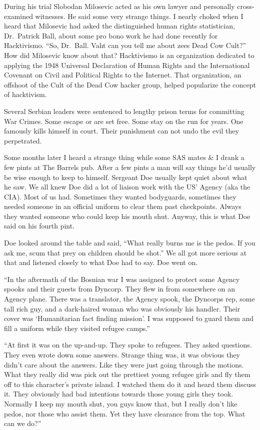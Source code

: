 During his trial Slobodan Milosevic acted as his own lawyer and personally cross-examined witnesses. He said some very strange things. I nearly choked when I heard that Milosevic had asked the distinguished human rights statistician, Dr.\ Patrick Ball, about some pro bono work he had done recently for Hacktivismo. ``So, Dr.\ Ball. Vaht can you tell me about zees Dead Cow Cult?'' How did Milosevic know about that? Hacktivismo is an organization dedicated to applying the 1948 Universal Declaration of Human Rights and the International Covenant on Civil and Political Rights to the Internet. That organization, an offshoot of the Cult of the Dead Cow hacker group, helped popularize the concept of hacktivism.

Several Serbian leaders were sentenced to lengthy prison terms for committing War Crimes. Some escape or are set free. Some stay on the run for years. One famously kills himself in court. Their punishment can not undo the evil they perpetrated.

Some months later I heard a strange thing while some SAS mates \& I drank a few pints at The Barrels pub. After a few pints a man will say things he'd usually be wise enough to keep to himself. Sergeant Doe usually kept quiet about what he saw. We all knew Doe did a lot of liaison work with the US' Agency (aka the CIA). Most of us had. Sometimes they wanted bodyguards, sometimes they needed someone in an official uniform to clear them past checkpoints. Always they wanted someone who could keep his mouth shut. Anyway, this is what Doe said on his fourth pint.

Doe looked around the table and said, ``What really burns me is the pedos. If you ask me, scum that prey on children should be shot.'' We all got more serious at that and listened closely to what Doe had to say. Doe went on.

``In the aftermath of the Bosnian war I was assigned to protect some Agency spooks and their guests from Dyncorp. They flew in from somewhere on an Agency plane. There was a translator, the Agency spook, the Dyncorps rep, some tall rich guy, and a dark-haired woman who was obviously his handler. Their cover was `Humanitarian fact finding mission'. I was supposed to guard them and fill a uniform while they visited refugee camps.''

``At first it was on the up-and-up. They spoke to refugees. They asked questions. They even wrote down some answers. Strange thing was, it was obvious they didn't care about the answers. Like they were just going through the motions. What they really did was pick out the prettiest young refugee girls and fly them off to this character's private island. I watched them do it and heard them discuss it. They obviously had bad intentions towards those young girls they took. Normally I keep my mouth shut, you guys know that, but I really don't like pedos, nor those who assist them. Yet they have clearance from the top. What can we do?''

